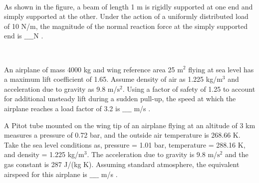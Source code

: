 \begin{figure}[!ht]
\centering
\resizebox{0.5\textwidth}{!}{%

}%
\end{figure}\\
\item As shown in the figure, a beam of length 1 m is rigidly supported at one end and simply supported at the other. Under the action of a uniformly distributed load of 10 N/m, the magnitude of the normal reaction force at the simply supported end is $\_\_\_\_$N .
\begin{figure}[!ht]
\centering
\resizebox{0.5\textwidth}{!}{%

}%
\end{figure}\\
\item An airplane of mass 4000 kg and wing reference area 25 $\text{m}^2$ flying at sea level has a maximum lift coefficient of 1.65. Assume density of air as 1.225 kg/$\text{m}^3$ and acceleration due to gravity as 9.8 m/$\text{s}^2$. Using a factor of safety of 1.25 to account for additional unsteady lift during a sudden pull-up, the speed at which the airplane reaches a load factor of 3.2 is $\_\_\_\_$ m/s . \\
\item A Pitot tube mounted on the wing tip of an airplane flying at an altitude of 3 km measures a pressure of 0.72 bar, and the outside air temperature is 268.66 K. Take the sea level conditions as, pressure = 1.01 bar, temperature = 288.16 K, and density = 1.225 kg/$\text{m}^3$. The acceleration due to gravity is 9.8 m/$\text{s}^2$ and the gas constant is 287 J/(kg K). Assuming standard atmosphere, the equivalent airspeed for this airplane is $\_\_\_\_$ m/s . \\
